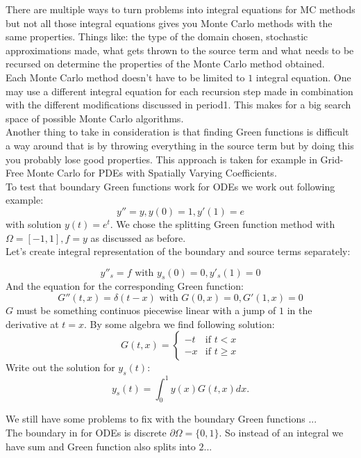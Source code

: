 There are multiple ways to turn problems into integral equations for MC methods
but not all those integral equations gives you Monte Carlo methods with the same properties.
Things like: the type of the domain chosen, stochastic approximations made, what gets thrown
to the source term and what needs to be recursed on determine the properties of the Monte
Carlo method obtained.\\

Each Monte Carlo method doesn't have to be limited to $1$ integral equation.
One may use a different integral equation for each recursion step made in combination
with the different modifications discussed in period1. This makes for a big search space
of possible Monte Carlo algorithms. \\


Another thing to take in consideration is that finding Green functions is difficult a way
around that is by throwing everything in the source term but by doing this you probably
lose good properties. This approach is taken for example in Grid-Free Monte Carlo for
PDEs with Spatially Varying Coefficients. \\

To test that boundary Green functions work for ODEs we work out following example:
$$
    y'' = y, y(0) = 1, y'(1)=e
$$
with solution $y(t) = e^{t}$. We chose the splitting Green function method with
$\Omega = [-1,1],f = y$ as discussed as before. \\

Let's create integral representation of the boundary and source terms separately:

$$
    y''_{s} = f \text{ with } y_s(0)=0, y'_s(1)=0
$$
And the equation for the corresponding Green function:
$$
    G''(t,x) = \delta(t-x) \text{ with } G(0,x)=0, G'(1,x)=0
$$
$G$ must be something continuos piecewise linear with a jump of $1$ in the derivative
at $t = x$. By some algebra we find following solution:
$$
    G(t,x) =
    \begin{cases}
        -t & \text{if } t <  x   \\
        -x & \text{if } t \ge  x
    \end{cases}
$$
Write out the solution for $y_{s}(t)$:
$$
    y_{s}(t) = \int_{0}^{1} y(x) G(t,x) dx.
$$

We still have some problems to fix with the boundary Green functions ... \\
The boundary in for ODEs is discrete $\partial \Omega = \{0,1\}$.
So instead of an integral we have sum and Green function also splits into $2$...

